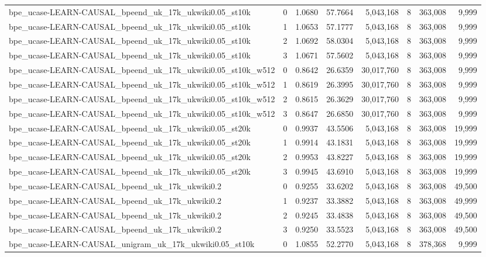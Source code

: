 \begin{tabular}{lrrrrrrr}
bpe\_ucase-LEARN-CAUSAL\_bpeend\_uk\_17k\_ukwiki0.05\_st10k & 0 & 1.0680 & 57.7664 & 5,043,168 & 8 & 363,008 & 9,999 \\
bpe\_ucase-LEARN-CAUSAL\_bpeend\_uk\_17k\_ukwiki0.05\_st10k & 1 & 1.0653 & 57.1777 & 5,043,168 & 8 & 363,008 & 9,999 \\
bpe\_ucase-LEARN-CAUSAL\_bpeend\_uk\_17k\_ukwiki0.05\_st10k & 2 & 1.0692 & 58.0304 & 5,043,168 & 8 & 363,008 & 9,999 \\
bpe\_ucase-LEARN-CAUSAL\_bpeend\_uk\_17k\_ukwiki0.05\_st10k & 3 & 1.0671 & 57.5602 & 5,043,168 & 8 & 363,008 & 9,999 \\
bpe\_ucase-LEARN-CAUSAL\_bpeend\_uk\_17k\_ukwiki0.05\_st10k\_w512 & 0 & 0.8642 & 26.6359 & 30,017,760 & 8 & 363,008 & 9,999 \\
bpe\_ucase-LEARN-CAUSAL\_bpeend\_uk\_17k\_ukwiki0.05\_st10k\_w512 & 1 & 0.8619 & 26.3995 & 30,017,760 & 8 & 363,008 & 9,999 \\
bpe\_ucase-LEARN-CAUSAL\_bpeend\_uk\_17k\_ukwiki0.05\_st10k\_w512 & 2 & 0.8615 & 26.3629 & 30,017,760 & 8 & 363,008 & 9,999 \\
bpe\_ucase-LEARN-CAUSAL\_bpeend\_uk\_17k\_ukwiki0.05\_st10k\_w512 & 3 & 0.8647 & 26.6850 & 30,017,760 & 8 & 363,008 & 9,999 \\
bpe\_ucase-LEARN-CAUSAL\_bpeend\_uk\_17k\_ukwiki0.05\_st20k & 0 & 0.9937 & 43.5506 & 5,043,168 & 8 & 363,008 & 19,999 \\
bpe\_ucase-LEARN-CAUSAL\_bpeend\_uk\_17k\_ukwiki0.05\_st20k & 1 & 0.9914 & 43.1831 & 5,043,168 & 8 & 363,008 & 19,999 \\
bpe\_ucase-LEARN-CAUSAL\_bpeend\_uk\_17k\_ukwiki0.05\_st20k & 2 & 0.9953 & 43.8227 & 5,043,168 & 8 & 363,008 & 19,999 \\
bpe\_ucase-LEARN-CAUSAL\_bpeend\_uk\_17k\_ukwiki0.05\_st20k & 3 & 0.9945 & 43.6910 & 5,043,168 & 8 & 363,008 & 19,999 \\
bpe\_ucase-LEARN-CAUSAL\_bpeend\_uk\_17k\_ukwiki0.2 & 0 & 0.9255 & 33.6202 & 5,043,168 & 8 & 363,008 & 49,500 \\
bpe\_ucase-LEARN-CAUSAL\_bpeend\_uk\_17k\_ukwiki0.2 & 1 & 0.9237 & 33.3882 & 5,043,168 & 8 & 363,008 & 49,999 \\
bpe\_ucase-LEARN-CAUSAL\_bpeend\_uk\_17k\_ukwiki0.2 & 2 & 0.9245 & 33.4838 & 5,043,168 & 8 & 363,008 & 49,500 \\
bpe\_ucase-LEARN-CAUSAL\_bpeend\_uk\_17k\_ukwiki0.2 & 3 & 0.9250 & 33.5523 & 5,043,168 & 8 & 363,008 & 49,500 \\
bpe\_ucase-LEARN-CAUSAL\_unigram\_uk\_17k\_ukwiki0.05\_st10k & 0 & 1.0855 & 52.2770 & 5,043,168 & 8 & 378,368 & 9,999 \\

\end{tabular}
